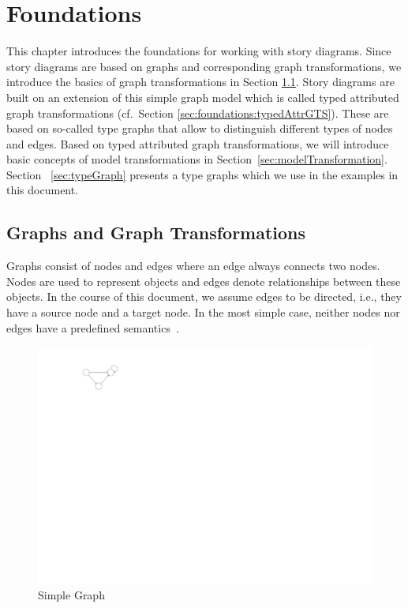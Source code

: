 \chapter{Foundations}
\label{sec:foundations}

This chapter introduces the foundations for working with story diagrams.
Since story diagrams are based on graphs and corresponding graph transformations,
we introduce the basics of graph transformations in Section \ref{sec:foundations:simpleGTS}.
Story diagrams are built on an extension of this simple graph model which is called typed attributed graph transformations (cf.\ Section \ref{sec:foundations:typedAttrGTS}).
These are based on so-called type graphs that allow to distinguish different types of nodes and edges.
Based on typed attributed graph transformations, we will introduce basic concepts of model transformations in Section~\ref{sec:modelTransformation}.
Section~ \ref{sec:typeGraph} presents a type graphs which we use in the examples in this document.

\section{Graphs and Graph Transformations}
\label{sec:foundations:simpleGTS}

Graphs consist of nodes and edges where an edge always connects two nodes. Nodes are used to represent objects and edges denote relationships between these objects. In the course of this document, we assume edges to be directed, i.e., they have a source node and a target node. In the most simple case, neither nodes nor edges have a predefined semantics~\cite{Roz97}.

\begin{figure}[htbp]
  \centering
  \includegraphics[scale=1.5]{figures/SimpleGraph}
  \caption{Simple Graph}
  \label{fig:simpleGraph}
\end{figure}

